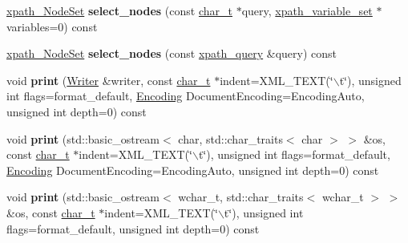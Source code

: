 \begin{DoxyCompactItemize}
\item 
\hypertarget{classphys_1_1xml_1_1Node_a8a97b11e4ae91251677720d5ed80353b}{
\hyperlink{classphys_1_1xml_1_1xpath__NodeSet}{xpath\_\-NodeSet} {\bfseries select\_\-nodes} (const \hyperlink{namespacephys_1_1xml_afc87705cd1c2917d87b879715a2d8f6e}{char\_\-t} $\ast$query, \hyperlink{classphys_1_1xml_1_1xpath__variable__set}{xpath\_\-variable\_\-set} $\ast$variables=0) const }
\label{d7/d0a/classphys_1_1xml_1_1Node_a8a97b11e4ae91251677720d5ed80353b}

\item 
\hypertarget{classphys_1_1xml_1_1Node_a62baac899eb6295ed8722f35a9337ba7}{
\hyperlink{classphys_1_1xml_1_1xpath__NodeSet}{xpath\_\-NodeSet} {\bfseries select\_\-nodes} (const \hyperlink{classphys_1_1xml_1_1xpath__query}{xpath\_\-query} \&query) const }
\label{d7/d0a/classphys_1_1xml_1_1Node_a62baac899eb6295ed8722f35a9337ba7}

\item 
\hypertarget{classphys_1_1xml_1_1Node_a8214c3d445a3e770ab6361955308af6d}{
void {\bfseries print} (\hyperlink{classphys_1_1xml_1_1Writer}{Writer} \&writer, const \hyperlink{namespacephys_1_1xml_afc87705cd1c2917d87b879715a2d8f6e}{char\_\-t} $\ast$indent=XML\_\-TEXT(\char`\"{}$\backslash$t\char`\"{}), unsigned int flags=format\_\-default, \hyperlink{namespacephys_1_1xml_a420f5de782438f88160321385bea2015}{Encoding} DocumentEncoding=EncodingAuto, unsigned int depth=0) const }
\label{d7/d0a/classphys_1_1xml_1_1Node_a8214c3d445a3e770ab6361955308af6d}

\item 
\hypertarget{classphys_1_1xml_1_1Node_a7f64062c138f2a418568a46900c94508}{
void {\bfseries print} (std::basic\_\-ostream$<$ char, std::char\_\-traits$<$ char $>$ $>$ \&os, const \hyperlink{namespacephys_1_1xml_afc87705cd1c2917d87b879715a2d8f6e}{char\_\-t} $\ast$indent=XML\_\-TEXT(\char`\"{}$\backslash$t\char`\"{}), unsigned int flags=format\_\-default, \hyperlink{namespacephys_1_1xml_a420f5de782438f88160321385bea2015}{Encoding} DocumentEncoding=EncodingAuto, unsigned int depth=0) const }
\label{d7/d0a/classphys_1_1xml_1_1Node_a7f64062c138f2a418568a46900c94508}

\item 
\hypertarget{classphys_1_1xml_1_1Node_af879d58cf08553c5f2dfa813e7a56ce6}{
void {\bfseries print} (std::basic\_\-ostream$<$ wchar\_\-t, std::char\_\-traits$<$ wchar\_\-t $>$ $>$ \&os, const \hyperlink{namespacephys_1_1xml_afc87705cd1c2917d87b879715a2d8f6e}{char\_\-t} $\ast$indent=XML\_\-TEXT(\char`\"{}$\backslash$t\char`\"{}), unsigned int flags=format\_\-default, unsigned int depth=0) const }
\label{d7/d0a/classphys_1_1xml_1_1Node_af879d58cf08553c5f2dfa813e7a56ce6}


\end{DoxyCompactItemize}
